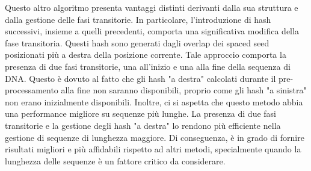 Questo altro algoritmo presenta vantaggi distinti derivanti dalla sua struttura e dalla gestione delle fasi transitorie. In particolare, l'introduzione di hash successivi, insieme a quelli precedenti, comporta una significativa modifica della fase transitoria. Questi hash sono generati dagli overlap dei spaced seed posizionati più a destra della posizione corrente. Tale approccio comporta la presenza di due fasi transitorie, una all'inizio e una alla fine della sequenza di DNA. Questo è dovuto al fatto che gli hash "a destra" calcolati durante il pre-processamento alla fine non saranno disponibili, proprio come gli hash "a sinistra" non erano inizialmente disponibili. Inoltre, ci si aspetta che questo metodo abbia una performance migliore su sequenze più lunghe. La presenza di due fasi transitorie e la gestione degli hash "a destra" lo rendono più efficiente nella gestione di sequenze di lunghezza maggiore. Di conseguenza, è in grado di fornire risultati migliori e più affidabili rispetto ad altri metodi, specialmente quando la lunghezza delle sequenze è un fattore critico da considerare.
